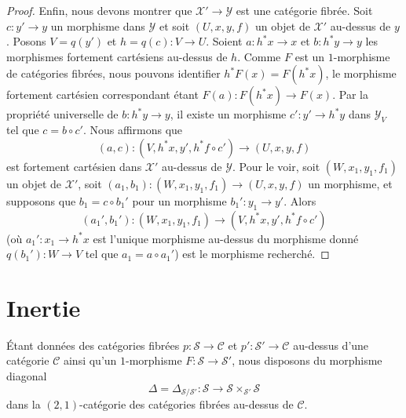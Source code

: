 \begin{proof}
\medskip\noindent
Enfin, nous devons montrer que $\mathcal{X}' \to \mathcal{Y}$ est une
catégorie fibrée. Soit $c : y' \to y$ un morphisme dans $\mathcal{Y}$
et soit $(U, x, y, f)$ un objet de $\mathcal{X}'$ au-dessus de $y$.
Posons $V = q(y')$ et $h = q(c) : V \to U$. Soient
$a : h^*x \to x$ et $b : h^*y \to y$ les morphismes fortement cartésiens
au-dessus de $h$.
Comme $F$ est un $1$-morphisme de catégories fibrées, nous pouvons identifier
$h^*F(x) = F(h^*x)$, le morphisme fortement cartésien correspondant étant
$F(a) : F(h^*x) \to F(x)$. Par la propriété universelle de
$b : h^*y \to y$, il existe un morphisme $c' : y' \to h^*y$ dans
$\mathcal{Y}_V$ tel que $c = b \circ c'$. Nous affirmons que
$$
(a, c) : (V, h^*x, y', h^*f \circ c') \longrightarrow (U, x, y, f)
$$
est fortement cartésien dans $\mathcal{X}'$ au-dessus de $\mathcal{Y}$.
Pour le voir, soit $(W, x_1, y_1, f_1)$ un objet de $\mathcal{X}'$, soit
$(a_1, b_1) : (W, x_1, y_1, f_1) \to (U, x, y, f)$ un morphisme,
et supposons que $b_1 = c \circ b_1'$ pour un morphisme
$b_1' : y_1 \to y'$. Alors
$$
(a_1', b_1') : (W, x_1, y_1, f_1) \longrightarrow (V, h^*x, y', h^*f \circ c')
$$
(où $a_1' : x_1 \to h^*x$ est l'unique morphisme au-dessus du morphisme donné
$q(b_1') : W \to V$ tel que $a_1 = a \circ a_1'$)
est le morphisme recherché.
\end{proof}
\section{Inertie}
\label{section-inertia}

\noindent
Étant données des catégories fibrées $p : \mathcal{S} \to \mathcal{C}$ et
$p' : \mathcal{S}' \to \mathcal{C}$ au-dessus d'une catégorie $\mathcal{C}$
ainsi qu'un $1$-morphisme $F : \mathcal{S} \to \mathcal{S}'$,
nous disposons du morphisme diagonal
$$
\Delta = \Delta_{\mathcal{S}/\mathcal{S}'} :
\mathcal{S} \longrightarrow \mathcal{S} \times_{\mathcal{S}'} \mathcal{S}
$$
dans la $(2, 1)$-catégorie des catégories fibrées au-dessus de $\mathcal{C}$.


